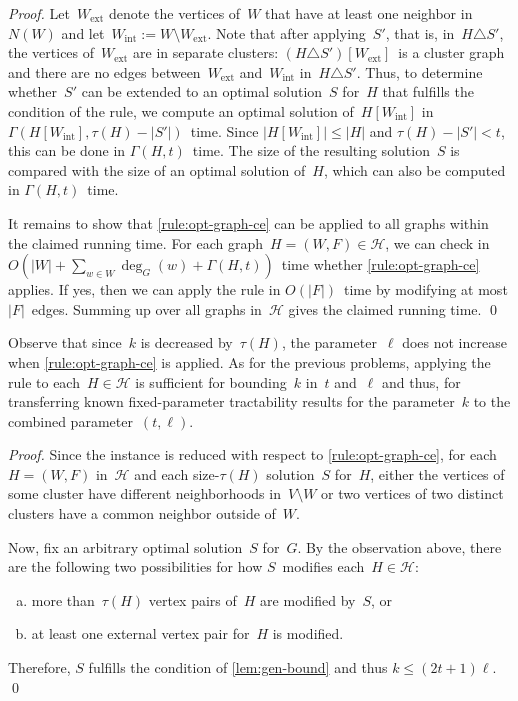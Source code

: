 \documentclass[envcountsame,numbook,smallextended]{svjour3}
\numberwithin{equation}{section}
\numberwithin{figure}{section}
\newcommand{\symdiff}{\triangle}
\newcommand{\packing}{\ensuremath{\mathcal H}}
\newcommand{\CEGP}{\textsc{Cluster Editing with  Cost-$t$ Packing}}
\newcommand{\Time}{\ensuremath{\Gamma}}
\newcommand{\Wext}{\ensuremath{W_\text{ext}}}
\newcommand{\Wint}{\ensuremath{W_\text{int}}}
\begin{document}
\begin{proof}
  Let~$\Wext$ denote the vertices of~$W$ that have at least one neighbor in~$N(W)$ and
  let~$\Wint:=W\setminus \Wext$. Note that after applying~$S'$, that is,
  in~$H \symdiff{} S'$, the vertices of~$\Wext$ are in separate clusters:
  $(H\symdiff{} S')[\Wext]$~is a cluster graph and
  there are no edges between~$\Wext$ and~$\Wint$ in~$H\symdiff{} S'$.
  Thus, to determine whether~$S'$ can be extended
  to an optimal solution~$S$ for~$H$
  that fulfills the condition of the rule,
  we compute an optimal solution of~$H[\Wint]$ in
  $\Time(H[\Wint],\tau(H)-|S'|)$~time.
  Since $|H[\Wint]|\le |H|$ and $\tau(H)-|S'|<t$, this can be done in
  $\Time(H,t)$~time. The size of the resulting solution~$S$ is compared with the size of
  an optimal solution of~$H$, which can also be computed in $\Time(H,t)$~time.

  It remains to show that \cref{rule:opt-graph-ce}
  can be applied to all graphs
  within the claimed running time.
  For each graph~$H=(W,F)\in \packing$,
  we can check
  in $O(|W|+\sum_{w\in W} \deg_G(w)+\Time(H,t))$~time
  whether \cref{rule:opt-graph-ce} applies.
  If yes,  then we can apply the rule in $O(|F|)$~time
  by modifying at most $|F|$~edges.
  Summing up over all graphs in~$\packing$
  gives the claimed running time.
\qed\end{proof}


\noindent Observe that since~$k$ is decreased by~$\tau(H)$, the parameter~$\ell$ does not increase when \cref{rule:opt-graph-ce} is applied. As for the previous problems, applying the rule to each~$H\in \packing$ is sufficient for bounding~\(k\) in~\(t\) and~\(\ell\) and thus, for transferring known fixed-parameter tractability results for the parameter~\(k\) to the combined parameter~\((t,\ell)\).

\begin{proof}
  Since the instance is reduced
  with respect to \cref{rule:opt-graph-ce},
  for each~$H=(W,F)$ in~$\packing$ and
  each size-$\tau(H)$ solution~$S$ for~$H$,
  either the vertices of some cluster
  have different neighborhoods in~$V\setminus W$
  or two vertices of two distinct clusters
  have a common neighbor outside of~$W$. 

  Now,
  fix an arbitrary optimal solution~$S$ for~$G$.
  By the observation above,
  there are the following two possibilities
  for how $S$~modifies each~$H\in \packing$:
  \begin{enumerate}[(a)]
  \item\label{ce-inside} more than~$\tau(H)$ vertex pairs of~$H$ are modified by~$S$, or
  \item\label{ce-outside} at least one external vertex pair for~$H$ is modified.
  \end{enumerate}
Therefore, $S$ fulfills the condition of \cref{lem:gen-bound} and thus $k\le (2t+1)\ell$.
\qed\end{proof}
\end{document}
